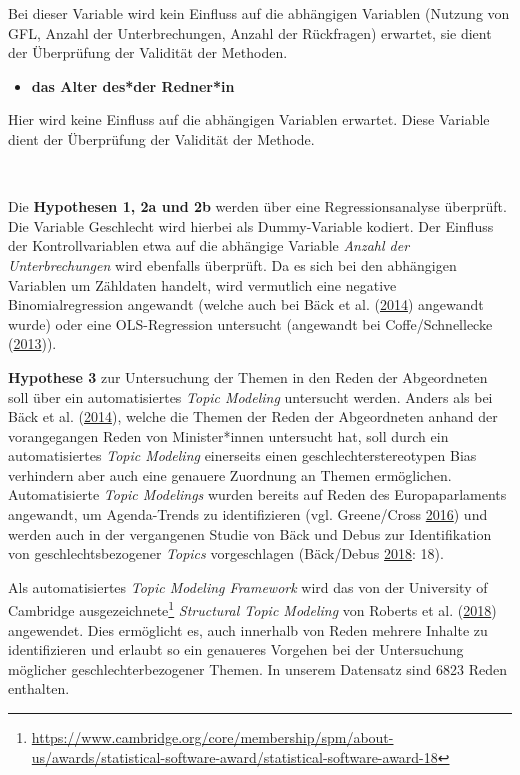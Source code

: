 \documentclass[12pt,ngerman,]{article}
\providecommand{\tightlist}{%
\setlength{\itemsep}{0pt}\setlength{\parskip}{0pt}}
\begin{document}
Bei dieser Variable wird kein Einfluss auf die abhängigen Variablen
(Nutzung von GFL, Anzahl der Unterbrechungen, Anzahl der Rückfragen)
erwartet, sie dient der Überprüfung der Validität der Methoden.

\begin{itemize}
\tightlist
\item
  \textbf{das Alter des*der Redner*in}
\end{itemize}

Hier wird keine Einfluss auf die abhängigen Variablen erwartet. Diese
Variable dient der Überprüfung der Validität der Methode.

~

Die \textbf{Hypothesen 1, 2a und 2b} werden über eine Regressionsanalyse
überprüft. Die Variable Geschlecht wird hierbei als Dummy-Variable
kodiert. Der Einfluss der Kontrollvariablen etwa auf die abhängige
Variable \emph{Anzahl der Unterbrechungen} wird ebenfalls überprüft. Da
es sich bei den abhängigen Variablen um Zähldaten handelt, wird
vermutlich eine negative Binomialregression angewandt (welche auch bei
Bäck et al. (\protect\hyperlink{ref-back_2014}{2014}) angewandt wurde)
oder eine OLS-Regression untersucht (angewandt bei Coffe/Schnellecke
(\protect\hyperlink{ref-coffe_2013}{2013})).

\textbf{Hypothese 3} zur Untersuchung der Themen in den Reden der
Abgeordneten soll über ein automatisiertes \emph{Topic Modeling}
untersucht werden. Anders als bei Bäck et al.
(\protect\hyperlink{ref-back_2014}{2014}), welche die Themen der Reden
der Abgeordneten anhand der vorangegangen Reden von Minister*innen
untersucht hat, soll durch ein automatisiertes \emph{Topic Modeling}
einerseits einen geschlechterstereotypen Bias verhindern aber auch eine
genauere Zuordnung an Themen ermöglichen. Automatisierte \emph{Topic
Modelings} wurden bereits auf Reden des Europaparlaments angewandt, um
Agenda-Trends zu identifizieren (vgl. Greene/Cross
\protect\hyperlink{ref-greene_2016}{2016}) und werden auch in der
vergangenen Studie von Bäck und Debus zur Identifikation von
geschlechtsbezogener \emph{Topics} vorgeschlagen (Bäck/Debus
\protect\hyperlink{ref-back_2018}{2018}: 18).

Als automatisiertes \emph{Topic Modeling Framework} wird das von der
University of Cambridge ausgezeichnete\footnote{\url{https://www.cambridge.org/core/membership/spm/about-us/awards/statistical-software-award/statistical-software-award-18}}
\emph{Structural Topic Modeling} von Roberts et al.
(\protect\hyperlink{ref-roberts_2018}{2018}) angewendet. Dies ermöglicht
es, auch innerhalb von Reden mehrere Inhalte zu identifizieren und
erlaubt so ein genaueres Vorgehen bei der Untersuchung möglicher
geschlechterbezogener Themen. In unserem Datensatz sind 6823 Reden
enthalten.
\end{document}
